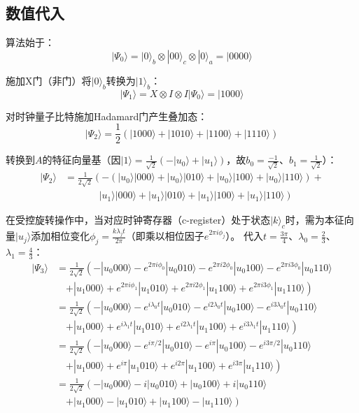 \documentclass{article}
\begin{document}
\subsection{数值代入}

算法始于：
\[
|\Psi_0\rangle = |0\rangle_b \otimes |00\rangle_c \otimes |0\rangle_a = |0000\rangle
\]

施加X门（非门）将\(|0\rangle_b\)转换为\(|1\rangle_b\)：
\[
|\Psi_1\rangle = X \otimes I \otimes I |\Psi_0\rangle = |1000\rangle
\]

对时钟量子比特施加Hadamard门产生叠加态：
\[
|\Psi_2\rangle = \frac{1}{2}(|1000\rangle + |1010\rangle + |1100\rangle + |1110\rangle)
\]

转换到\(A\)的特征向量基（因\(|1\rangle = \frac{1}{\sqrt{2}}(-|u_0\rangle + |u_1\rangle)\)，故\(b_0 = \frac{-1}{\sqrt{2}}\)、\(b_1 = \frac{1}{\sqrt{2}}\)）：
\[
\begin{aligned}
|\Psi_2\rangle &= \frac{1}{2\sqrt{2}}\left( -\left(|u_0\rangle|000\rangle + |u_0\rangle|010\rangle + |u_0\rangle|100\rangle + |u_0\rangle|110\rangle\right) + \right. \\
&\quad \left. \phantom{-\left( \right)} |u_1\rangle|000\rangle + |u_1\rangle|010\rangle + |u_1\rangle|100\rangle + |u_1\rangle|110\rangle \right)
\end{aligned}
\]

在受控旋转操作中，当对应时钟寄存器（c-register）处于状态\(|k\rangle_c\)时，需为本征向量\(|u_j\rangle\)添加相位变化\(\phi_j = \frac{k\lambda_j t}{2\pi}\)（即乘以相位因子\(e^{2\pi i\phi_j}\)）。
代入\(t = \frac{3\pi}{4}\)、\(\lambda_0 = \frac{2}{3}\)、\(\lambda_1 = \frac{4}{3}\)：
\[
\begin{aligned}
|\Psi_3\rangle &= \frac{1}{2\sqrt{2}} \left( -|u_{0}000\rangle - e^{2\pi i\phi_0}|u_{0}010\rangle - e^{2\pi i2\phi_0}|u_{0}100\rangle - e^{2\pi i3\phi_0}|u_{0}110\rangle \right. \\
&\quad \left. + |u_{1}000\rangle + e^{2\pi i\phi_1}|u_{1}010\rangle + e^{2\pi i2\phi_1}|u_{1}100\rangle + e^{2\pi i3\phi_1}|u_{1}110\rangle \right) \\
&= \frac{1}{2\sqrt{2}} \left( -|u_{0}000\rangle - e^{i\lambda_0 t}|u_{0}010\rangle - e^{i2\lambda_0 t}|u_{0}100\rangle - e^{i3\lambda_0 t}|u_{0}110\rangle \right. \\
&\quad \left. + |u_{1}000\rangle + e^{i\lambda_1 t}|u_{1}010\rangle + e^{i2\lambda_1 t}|u_{1}100\rangle + e^{i3\lambda_1 t}|u_{1}110\rangle \right) \\
&= \frac{1}{2\sqrt{2}} \left( -|u_{0}000\rangle - e^{i\pi/2}|u_{0}010\rangle - e^{i\pi}|u_{0}100\rangle - e^{i3\pi/2}|u_{0}110\rangle \right. \\
&\quad \left. + |u_{1}000\rangle + e^{i\pi}|u_{1}010\rangle + e^{i2\pi}|u_{1}100\rangle + e^{i3\pi}|u_{1}110\rangle \right) \\
&= \frac{1}{2\sqrt{2}} \left( -|u_{0}000\rangle - i|u_{0}010\rangle + |u_{0}100\rangle + i|u_{0}110\rangle \right. \\
&\quad \left. + |u_{1}000\rangle - |u_{1}010\rangle + |u_{1}100\rangle - |u_{1}110\rangle \right)
\end{aligned}
\]
\end{document}
